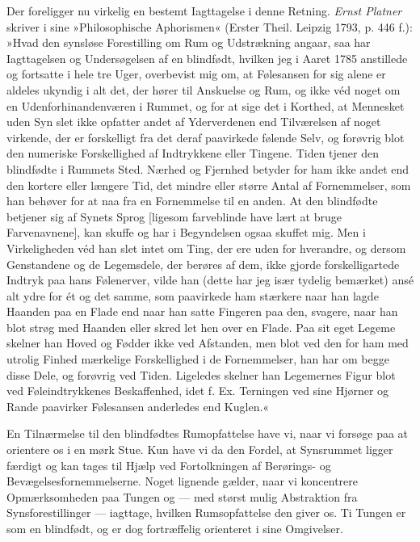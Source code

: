 \documentclass[12pt,a4paper,openany]{book}
\newcommand{\opage}[1]{\marginnote{\footnotesize\textit{[#1]}}}
\begin{document}
Der foreligger nu virkelig en bestemt Iagttagelse i denne Retning.
\emph{Ernst Platner} skriver i sine »Philosophische Aphorismen« (Erster
Theil. Leipzig 1793, p. 446 f.): »Hvad den synsløse Forestilling om Rum
og Udstrækning angaar, saa har Iagttagelsen og Undersøgelsen af en
blindfødt, hvilken jeg i Aaret 1785 anstillede og fortsatte i hele tre
Uger, overbevist mig om, at Følesansen for sig alene er aldeles ukyndig
i alt det, der hører til Anskuelse og Rum, og ikke véd noget om en
Udenforhinandenværen i Rummet, og for at sige det i Korthed, at
Mennesket uden Syn slet ikke opfatter andet af Yderverdenen end
Tilværelsen af noget virkende, der er forskelligt fra det deraf
paavirkede følende Selv, og forøvrig blot den numeriske Forskellighed af
Indtrykkene eller Tingene. Tiden tjener den blindfødte i Rummets Sted.
Nærhed og Fjernhed
\opage{242}betyder for ham ikke andet end den kortere eller længere Tid,
det mindre eller større Antal af Fornemmelser, som han behøver for at
naa fra en Fornemmelse til en anden. At den blindfødte betjener sig af
Synets Sprog [ligesom farveblinde have lært at bruge Farvenavnene], kan
skuffe og har i Begyndelsen ogsaa skuffet mig. Men i Virkeligheden véd
han slet intet om Ting, der ere uden for hverandre, og dersom
Genstandene og de Legemsdele, der berøres af dem, ikke gjorde
forskelligartede Indtryk paa hans Følenerver, vilde han (dette har jeg
især tydelig bemærket) ansé alt ydre for ét og det samme, som paavirkede
ham stærkere naar han lagde Haanden paa en Flade end naar han satte
Fingeren paa den, svagere, naar han blot strøg med Haanden eller skred
let hen over en Flade. Paa sit eget Legeme skelner han Hoved og Fødder
ikke ved Afstanden, men blot ved den for ham med utrolig Finhed
mærkelige Forskellighed i de Fornemmelser, han har om begge disse Dele,
og forøvrig ved Tiden. Ligeledes skelner han Legemernes Figur blot ved
Føleindtrykkenes Beskaffenhed, idet f. Ex. Terningen ved sine Hjørner og
Rande paavirker Følesansen anderledes end Kuglen.«

En Tilnærmelse til den blindfødtes Rumopfattelse have vi, naar vi
forsøge paa at orientere os i en mørk Stue. Kun have vi da den Fordel,
at Synsrummet ligger færdigt og kan tages til Hjælp ved Fortolkningen af
Berørings- og Bevægelsesfornemmelserne. Noget lignende gælder, naar vi
koncentrere Opmærksomheden paa Tungen og --- med størst mulig
Abstraktion fra Synsforestillinger --- iagttage, hvilken Rumsopfattelse
den giver os. Ti Tungen er som en blindfødt, og er dog fortræffelig
orienteret i sine Omgivelser.
\end{document}
